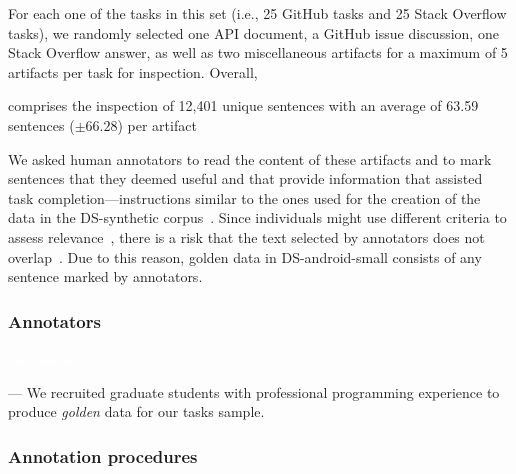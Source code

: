 For each one of the tasks in this set (i.e., 25 GitHub tasks and 25 Stack Overflow tasks), we randomly selected 
one API document, a GitHub issue discussion, one Stack Overflow answer, as well as two  miscellaneous artifacts for a maximum of 5 artifacts per task for inspection.
Overall, 

comprises the inspection of 
12,401 unique sentences with an average of 63.59 sentences ($\pm 66.28$) per artifact 



We asked human annotators to read the content of these
artifacts and 
to mark sentences that they deemed useful and that provide information that assisted task completion---instructions similar to the ones used for the creation of the 
data in the \acs{DS-synthetic} corpus~\cite{marques2020}.
Since individuals might use different criteria to
assess relevance~\cite{Barry1994, Barry1998, Freund2015},
there is a risk that
the text selected by annotators does not overlap~\cite{Freund2013, Freund2015}.
Due to this reason, golden data in \acs{DS-android-small} consists of any sentence marked by annotators. 






\subsubsection{Annotators}
\textcolor{white}{force ident} %

--- We recruited  graduate students with professional programming experience to produce \textit{golden} data for our tasks sample. \vspace{3mm}


\subsubsection{Annotation procedures}

 


